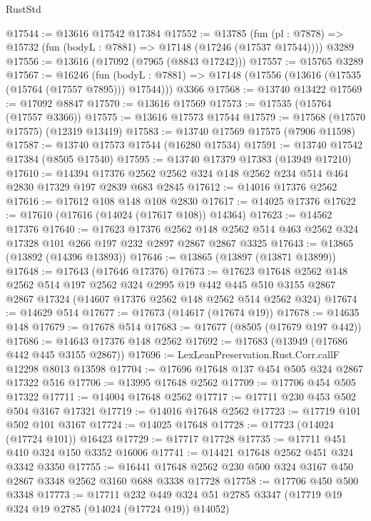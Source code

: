 \begin{lexlean}{RustStd}
\begin{coremodule}
@17544 := @13616 @17542 @17384
@17552 := @13785
    (fun (pl : @7878) => @15732 (fun (bodyL : @7881) => @17148 (@17246 (@17537 @17544))))
    @3289
@17556 := @13616 (@17092 (@7965 (@8843 @17242)))
@17557 := @15765 @3289
@17567 := @16246
    (fun (bodyL : @7881) => @17148 (@17556 (@13616 (@17535 (@15764 (@17557 @7895))) @17544)))
    @3366
@17568 := @13740 @13422
@17569 := @17092 @8847
@17570 := @13616 @17569
@17573 := @17535 (@15764 (@17557 @3366))
@17575 := @13616 @17573 @17544
@17579 := @17568 (@17570 @17575) (@12319 @13419)
@17583 := @13740 @17569 @17575 (@7906 @11598)
@17587 := @13740 @17573 @17544 (@16280 @17534)
@17591 := @13740 @17542 @17384 (@8505 @17540)
@17595 := @13740 @17379 @17383 (@13949 @17210)
@17610 := @14394
    @17376
    @2562
    @2562
    @324
    @148
    @2562
    @234
    @514
    @464
    @2830
    @17329
    @197
    @2839
    @683
    @2845
@17612 := @14016 @17376 @2562
@17616 := @17612 @108 @148 @108 @2830
@17617 := @14025 @17376
@17622 := @17610 (@17616 (@14024 (@17617 @108)) @14364)
@17623 := @14562 @17376
@17640 := @17623
    @17376
    @2562
    @148
    @2562
    @514
    @463
    @2562
    @324
    @17328
    @101
    @266
    @197
    @232
    @2897
    @2867
    @2867
    @3325
@17643 := @13865 (@13892 (@14396 @13893))
@17646 := @13865 (@13897 (@13871 @13899))
@17648 := @17643 (@17646 @17376)
@17673 := @17623
    @17648
    @2562
    @148
    @2562
    @514
    @197
    @2562
    @324
    @2995
    @19
    @442
    @445
    @510
    @3155
    @2867
    @2867
    @17324
    (@14607 @17376 @2562 @148 @2562 @514 @2562 @324)
@17674 := @14629 @514
@17677 := @17673 (@14617 (@17674 @19))
@17678 := @14635 @148
@17679 := @17678 @514
@17683 := @17677 (@8505 (@17679 @197 @442))
@17686 := @14643 @17376 @148 @2562
@17692 := @17683 (@13949 (@17686 @442 @445 @3155 @2867))
@17696 := LexLeanPreservation.Rust.Corr.callF @12298 @8013 @13598
@17704 := @17696 @17648 @137 @454 @505 @324 @2867 @17322 @516
@17706 := @13995 @17648 @2562
@17709 := @17706 @454 @505 @17322
@17711 := @14004 @17648 @2562
@17717 := @17711 @230 @453 @502 @504 @3167 @17321
@17719 := @14016 @17648 @2562
@17723 := @17719 @101 @502 @101 @3167
@17724 := @14025 @17648
@17728 := @17723 (@14024 (@17724 @101)) @16423
@17729 := @17717 @17728
@17735 := @17711 @451 @410 @324 @150 @3352 @16006
@17741 := @14421 @17648 @2562 @451 @324 @3342 @3350
@17755 := @16441 @17648 @2562 @230 @500 @324 @3167 @450 @2867 @3348 @2562 @3160 @688 @3338 @17728
@17758 := @17706 @450 @500 @3348
@17773 := @17711
    @232
    @449
    @324
    @51
    @2785
    @3347
    (@17719 @19 @324 @19 @2785 (@14024 (@17724 @19)) @14052)

\end{coremodule}
\end{lexlean}
